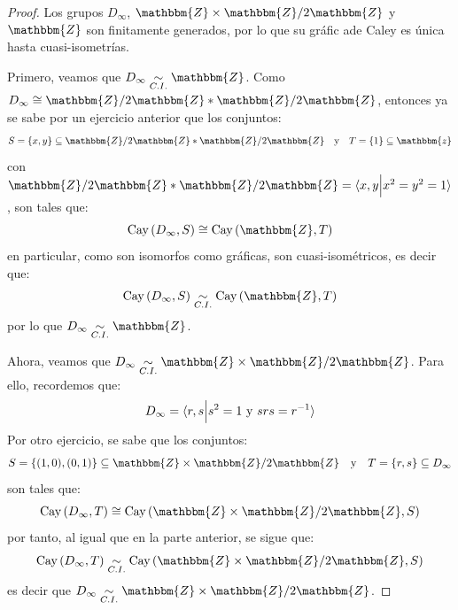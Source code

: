 \documentclass[12pt]{report}
\newcounter{it}
\theoremstyle{largebreak}
\newcommand{\bbm}[1]{\ensuremath{\mathbbm{#1}}}
\newcommand{\Cay}[1]{\ensuremath{\textup{Cay}\left(#1\right)}}
\newcommand{\gen}[1]{\ensuremath{\langle#1\rangle}}
\begin{document}
    \begin{proof}
        Los grupos $D_\infty$, $\bbm{Z}\times\bbm{Z}/2\bbm{Z}$ y $\bbm{Z}$ son finitamente generados, por lo que su gráfic ade Caley es única hasta cuasi-isometrías.

        Primero, veamos que $D_\infty\qisom\bbm{Z}$. Como $D_\infty\cong\bbm{Z}/2\bbm{Z}*\bbm{Z}/2\bbm{Z}$, entonces ya se sabe por un ejercicio anterior que los conjuntos:
        \begin{equation*}
            S=\left\{x,y \right\}\subseteq\bbm{Z}/2\bbm{Z}*\bbm{Z}/2\bbm{Z} \quad\textup{y}\quad T=\left\{1\right\}\subseteq\bbm{z}
        \end{equation*}
        con $\bbm{Z}/2\bbm{Z}*\bbm{Z}/2\bbm{Z}=\gen{x,y\Big|x^2=y^2=1}$, son tales que:
        \begin{equation*}
            \Cay{D_\infty,S}\cong\Cay{\bbm{Z},T}
        \end{equation*}
        en particular, como son isomorfos como gráficas, son cuasi-isométricos, es decir que:
        \begin{equation*}
            \Cay{D_\infty,S}\qisom\Cay{\bbm{Z},T}
        \end{equation*}
        por lo que $D_\infty\qisom\bbm{Z}$.

        Ahora, veamos que $D_\infty\qisom\bbm{Z}\times\bbm{Z}/2\bbm{Z}$. Para ello, recordemos que:
        \begin{equation*}
            D_\infty=\gen{r,s\Big|s^2=1\textup{ y }srs=r^{-1}}
        \end{equation*}
        Por otro ejercicio, se sabe que los conjuntos:
        \begin{equation*}
            S=\left\{(1,0),(0,1)\right\}\subseteq\bbm{Z}\times\bbm{Z}/2\bbm{Z}\quad\textup{y}\quad T=\left\{r,s \right\}\subseteq D_\infty
        \end{equation*}
        son tales que:
        \begin{equation*}
            \Cay{D_\infty,T}\cong\Cay{\bbm{Z}\times\bbm{Z}/2\bbm{Z},S}
        \end{equation*}
        por tanto, al igual que en la parte anterior, se sigue que:
        \begin{equation*}
            \Cay{D_\infty,T}\qisom\Cay{\bbm{Z}\times\bbm{Z}/2\bbm{Z},S}
        \end{equation*}
        es decir que $D_\infty\qisom\bbm{Z}\times\bbm{Z}/2\bbm{Z}$.
    \end{proof}
\end{document}
